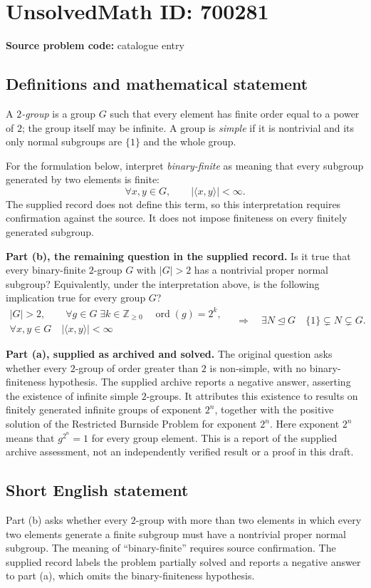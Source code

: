 \documentclass[11pt]{article}
\newcommand{\Z}{\mathbb{Z}}
\begin{document}
\section*{UnsolvedMath ID: 700281}
\textbf{Source problem code:} catalogue entry
\subsection{Definitions and mathematical statement}
A \emph{\(2\)-group} is a group \(G\) such that every element has finite order equal to a power of \(2\); the group itself may be infinite. A group is \emph{simple} if it is nontrivial and its only normal subgroups are \(\{1\}\) and the whole group.

For the formulation below, interpret \emph{binary-finite} as meaning that every subgroup generated by two elements is finite:
\[
\forall x,y\in G,\qquad |\langle x,y\rangle|<\infty.
\]
The supplied record does not define this term, so this interpretation requires confirmation against the source. It does not impose finiteness on every finitely generated subgroup.

\textbf{Part (b), the remaining question in the supplied record.} Is it true that every binary-finite \(2\)-group \(G\) with \(|G|>2\) has a nontrivial proper normal subgroup? Equivalently, under the interpretation above, is the following implication true for every group \(G\)?
\[
\begin{gathered}
|G|>2,\qquad
\forall g\in G\;\exists k\in\Z_{\geq 0}\quad \operatorname{ord}(g)=2^k,\\
\forall x,y\in G\quad |\langle x,y\rangle|<\infty
\end{gathered}
\quad\Longrightarrow\quad
\exists N\trianglelefteq G\quad \{1\}\subsetneq N\subsetneq G.
\]

\textbf{Part (a), supplied as archived and solved.} The original question asks whether every \(2\)-group of order greater than \(2\) is non-simple, with no binary-finiteness hypothesis. The supplied archive reports a negative answer, asserting the existence of infinite simple \(2\)-groups. It attributes this existence to results on finitely generated infinite groups of exponent \(2^n\), together with the positive solution of the Restricted Burnside Problem for exponent \(2^n\). Here exponent \(2^n\) means that \(g^{2^n}=1\) for every group element. This is a report of the supplied archive assessment, not an independently verified result or a proof in this draft.
\subsection{Short English statement}
Part (b) asks whether every \(2\)-group with more than two elements in which every two elements generate a finite subgroup must have a nontrivial proper normal subgroup. The meaning of ``binary-finite'' requires source confirmation. The supplied record labels the problem partially solved and reports a negative answer to part (a), which omits the binary-finiteness hypothesis.
\end{document}
